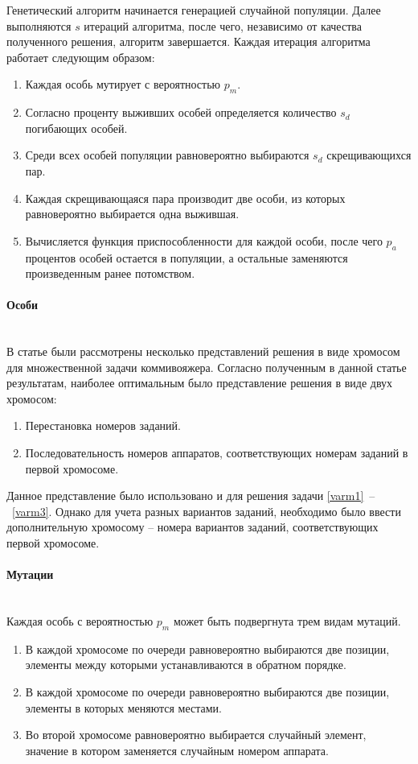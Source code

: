 \documentclass[a4paper,14pt,russian]{article}
\begin{document}
Генетический алгоритм начинается генерацией случайной популяции.
Далее выполняются $s$ итераций алгоритма, после чего, независимо от качества полученного решения, алгоритм завершается.
Каждая итерация алгоритма работает следующим образом:
\begin{enumerate}
\item Каждая особь мутирует с вероятностью $p_m$.
\item Согласно проценту выживших особей определяется количество $s_d$ погибающих особей.
\item Среди всех особей популяции равновероятно выбираются $s_d$ скрещивающихся пар.
\item Каждая скрещивающаяся пара производит две особи, из которых равновероятно выбирается одна выжившая.
\item Вычисляется функция приспособленности для каждой особи, после чего $p_a$ процентов особей остается в популяции, а остальные заменяются произведенным ранее потомством.
\end{enumerate}

\paragraph{Особи} ~\\
В статье \cite{kiraly2010novel} были рассмотрены несколько представлений решения в виде хромосом для множественной задачи коммивояжера. Согласно полученным в данной статье результатам, наиболее оптимальным было представление решения в виде двух хромосом:
\begin{enumerate}
\item Перестановка номеров заданий.
\item Последовательность номеров аппаратов, соответствующих номерам заданий в первой хромосоме.
\end{enumerate}

Данное представление было использовано и для решения задачи \eqref{varm1}~--~\eqref{varm3}. Однако для учета разных вариантов заданий, необходимо было ввести дополнительную хромосому -- номера вариантов заданий, соответствующих первой хромосоме.

\paragraph{Мутации} ~\\
Каждая особь с вероятностью $p_m$ может быть подвергнута трем видам мутаций.
\begin{enumerate}
\item В каждой хромосоме по очереди равновероятно выбираются две позиции, элементы между которыми устанавливаются в обратном порядке.
\item В каждой хромосоме по очереди равновероятно выбираются две позиции, элементы в которых меняются местами.
\item Во второй хромосоме равновероятно выбирается случайный элемент, значение в котором заменяется случайным номером аппарата.
\end{enumerate}
\end{document}

